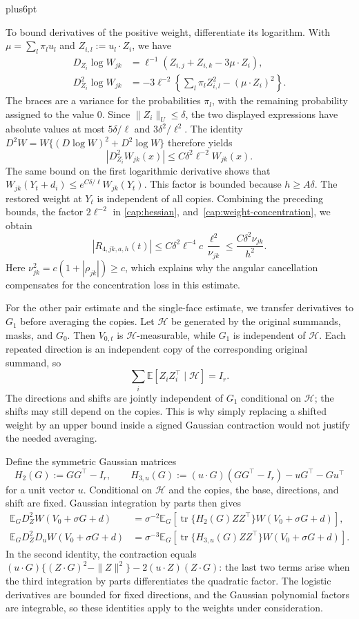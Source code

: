\documentclass[11pt,letterpaper,twoside,leqno]{article}
\makeatletter
\theoremstyle{bookplain}
\theoremstyle{bookremark}
\renewenvironment{proof}[1][\proofname]{\par
  \pushQED{\qed}\normalfont\topsep6pt plus6pt\relax
  \trivlist\item[\hskip\labelsep\bfseries #1\@addpunct{.}]\ignorespaces
}{\popQED\endtrivlist\@endpefalse}
\newcommand{\E}{\mathbb E}
\newcommand{\tr}{\operatorname{tr}}
\makeatother
\begin{document}
\begin{proof}
To bound derivatives of the positive weight, differentiate its
logarithm. With $\mu=\sum_l\pi_lu_l$ and
$Z_{i,l}:=u_l\cdot Z_i$, we have
\[
 \begin{aligned}
 D_{Z_i}\log W_{jk}
   &=\ell^{-1}(Z_{i,j}+Z_{i,k}-3\mu\cdot Z_i),\\
 D_{Z_i}^2\log W_{jk}
   &=-3\ell^{-2}\left\{\sum_l\pi_l Z_{i,l}^2
                                 -(\mu\cdot Z_i)^2\right\}.
 \end{aligned}
\]
The braces are a variance for the probabilities $\pi_l$, with
the remaining probability assigned to the value $0$.
Since $\|Z_i\|_U\le\delta$, the two displayed expressions
have absolute values at most $5\delta/\ell$ and
$3\delta^2/\ell^2$. The identity
$D^2W=W\{(D\log W)^2+D^2\log W\}$ therefore yields
\[
 |D_{Z_i}^2W_{jk}(x)|\le C\delta^2\ell^{-2}W_{jk}(x).
\]
The same bound on the first logarithmic derivative shows that
$W_{jk}(Y_t+d_i)\le e^{C\delta/\ell}W_{jk}(Y_t)$.
This factor is bounded because $h\ge A\delta$.
The restored weight at $Y_t$ is independent of all copies.
Combining the preceding bounds, the factor $2\ell^{-2}$ in
\eqref{cap:hessian}, and~\eqref{cap:weight-concentration}, we obtain
\[
 |R_{4,jk,a,h}(t)|
 \le C\delta^2\ell^{-4}c\,\frac{\ell^2}{\nu_{jk}}
 \le\frac{C\delta^2\nu_{jk}}{h^2}.
\]
Here $\nu_{jk}^2=c(1+|\rho_{jk}|)\ge c$, which explains
why the angular cancellation compensates for the concentration
loss in this estimate.

For the other pair estimate and the single-face estimate, we
transfer derivatives to $G_1$ before averaging the copies.
Let $\mathcal H$ be generated by the original summands, masks,
and $G_0$. Then $V_{0,t}$ is $\mathcal H$-measurable, while
$G_1$ is independent of $\mathcal H$. Each repeated direction
is an independent copy of the corresponding original summand,
so
\[
 \sum_i\E[Z_iZ_i^\top\mid\mathcal H]=I_r.
\]
The directions and shifts are jointly independent of $G_1$
conditional on $\mathcal H$; the shifts may still depend on
the copies. This is why simply replacing a shifted weight by
an upper bound inside a signed Gaussian contraction would not
justify the needed averaging.

Define the symmetric Gaussian matrices
\[
 H_2(G):=GG^\top-I_r,
 \qquad
 H_{3,u}(G):=(u\cdot G)(GG^\top-I_r)-uG^\top-Gu^\top
\]
for a unit vector $u$. Conditional on $\mathcal H$ and the
copies, the base, directions, and shift are fixed. Gaussian
integration by parts then gives
\begin{align*}
 \E_G D_Z^2W(V_0+\sigma G+d)
 &=\sigma^{-2}\E_G\!\left[
       \tr\{H_2(G)ZZ^\top\}W(V_0+\sigma G+d)\right],\\
 \E_G D_Z^2D_uW(V_0+\sigma G+d)
 &=\sigma^{-3}\E_G\!\left[
       \tr\{H_{3,u}(G)ZZ^\top\}W(V_0+\sigma G+d)\right].
\end{align*}
In the second identity, the contraction equals
$(u\cdot G)\{(Z\cdot G)^2-\|Z\|^2\}
 -2(u\cdot Z)(Z\cdot G)$: the last two terms arise when the
third integration by parts differentiates the quadratic factor.
The logistic derivatives are bounded for fixed directions, and
the Gaussian polynomial factors are integrable, so these
identities apply to the weights under consideration.


\end{proof}
\end{document}

